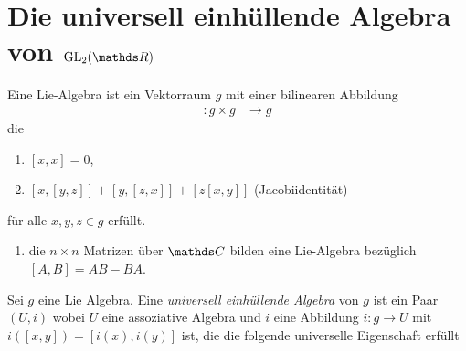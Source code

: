 \chapter{Die universell einhüllende Algebra von $\GL_2(\R)$}
Eine Lie-Algebra ist ein Vektorraum $g$ mit einer bilinearen Abbildung
\begin{align*}
[\cdot,\cdot] \colon g \times g &\to g
\end{align*}
die
\begin{enumerate}
\item $[x,x]=0$,
\item $[x,[y,z]]+[y,[z,x]]+[z[x,y]]$ (Jacobiidentität)
\end{enumerate}
für alle $x,y,z \in g$ erfüllt.

\begin{bsp}
\begin{enumerate}[label=(\roman*)]
\item die $n\times n$ Matrizen über $\C$ bilden eine Lie-Algebra bezüglich $[A,B]=AB-BA$.
\end{enumerate}
\end{bsp}

\begin{defi}
Sei $g$ eine Lie Algebra. Eine \emph{universell einhüllende Algebra} von $g$ ist ein Paar $(U,i)$ wobei $U$ eine assoziative Algebra und
$i$ eine Abbildung $i\colon g \to U$ mit
$i([x,y])=[i(x),i(y)]$ ist, die die folgende universelle Eigenschaft erfüllt
\end{defi}